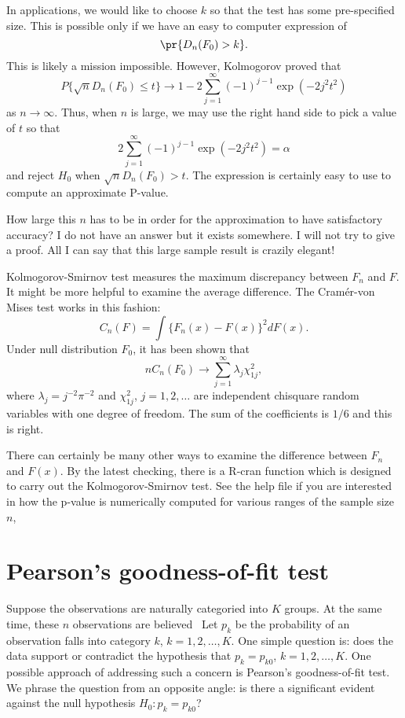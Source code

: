 In applications, we would like to choose $k$ so that the test has
some pre-specified size. This is possible only if we have an easy to
computer expression of
\[
\pr\{ D_n(F_0) > k \}.
\]
This is likely a mission impossible. However, Kolmogorov
proved that
\[
P\{ \sqrt{n} D_n(F_0) \leq t \} \to 1 - 2 \sum_{j=1}^\infty (-1)^{j-1} \exp(- 2 j^2 t^2)
\]
as $n \to \infty$. Thus, when $n$ is large, we may use the right hand
side to pick a value of $t$ so that
\[
2 \sum_{j=1}^\infty (-1)^{j-1} \exp(- 2 j^2 t^2) = \alpha
\]
and reject $H_0$ when $ \sqrt{n} D_n(F_0) > t$.
The expression is certainly easy to use to compute an
approximate P-value.

How large this $n$ has to be in order for the approximation
to have satisfactory accuracy? I do not have an answer but it exists somewhere.
I will not try to give a proof. All I can say that this
large sample result is crazily elegant!

Kolmogorov-Smirnov test measures the maximum discrepancy between
$F_n$ and $F$. It might be more helpful to examine the average
difference. The Cram\'er-von Mises test works in this fashion:
\[
C_n(F) = \int \{ F_n(x) - F(x)  \}^2 dF(x).
\]
Under null distribution $F_0$, it has been shown that
\[
n C_n(F_0) \to \sum_{j=1}^\infty \lambda_j \chi^2_{1j},
\]
where $\lambda_j = j^{-2} \pi^{-2}$
and $\chi^2_{1j}$, $j= 1, 2, \ldots$ are independent chisquare random variables
with one degree of freedom.
The sum of the coefficients is $1/6$ and this is right.

There can certainly be many other ways to examine
the difference between $F_n$ and $F(x)$.
By the latest checking, there is a R-cran function which is designed
to carry out the Kolmogorov-Smirnov test.
See the help file if you are interested in how the p-value is
numerically computed for various ranges of the sample size $n$,

\section{Pearson's goodness-of-fit test}
Suppose the observations are naturally categoried into $K$ groups.
At the same time, these $n$ observations are believed \iid\  Let $p_k$ be the
probability of an observation falls into category $k$, $k=1, 2, \ldots, K$.
One simple question is: does the data support or contradict the
hypothesis that $p_k = p_{k0}$, $k=1, 2, \ldots, K$.
One possible approach of addressing such a concern is
Pearson's goodness-of-fit test. We phrase the question from
an opposite angle: is there a significant evident against the null
hypothesis $H_0: p_k = p_{k0}$?

